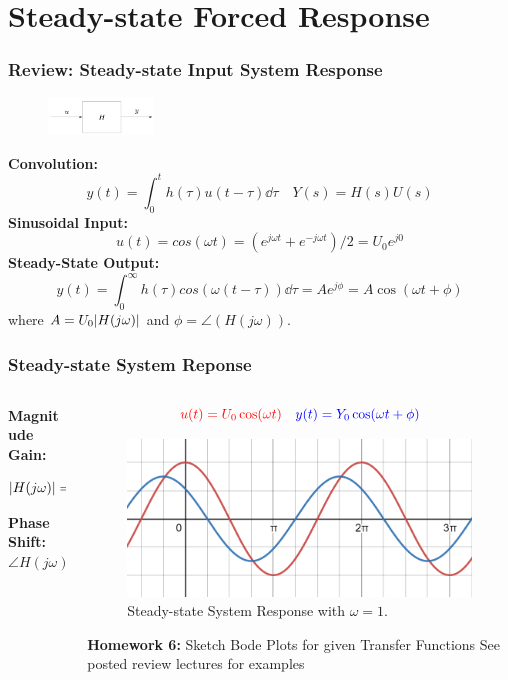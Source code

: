 \documentclass[aspectratio=169]{beamer}
\begin{document}
\section{Steady-state Forced Response}
\begin{frame}
	\frametitle{Review: Steady-state Input System Response}
	\begin{figure}
		\centering
		\includegraphics[width = 0.25\textwidth]{Images/H(s)_BlockDiagram.png}
	\end{figure}
	\textbf{Convolution:} 
	\[
		y(t) = \int_{0}^{t} h(\tau) u(t - \tau) \dd \tau 
		\quad 
		Y(s) = H(s) U(s)
	\]
	\textbf{Sinusoidal Input:} 
	\[
		u(t) = cos(\omega t) = (e^{j\omega t} + e^{-j\omega t})/2 = U_0 e^{j 0}
	\]
	\textbf{Steady-State Output:} 
	\[
		y(t) = \int_{0}^{\infty} h(\tau) cos(\omega (t - \tau)) \dd \tau = A e^{j \phi} = A \cos(\omega t + \phi)
	\]
	where $A = U_0 \abs{H(j \omega)}$ and $\phi = \angle(H(j \omega))$.
\end{frame}


\begin{frame}
	\frametitle{Steady-state System Reponse}
	\begin{columns}
		\begin{column}{0.3\textwidth}
			\textbf{Magnitude Gain:} 
			\[\abs{H(j\omega)} = \frac{Y_0}{U_0} = \frac{1.5}{2} = 0.75\]
			\textbf{Phase Shift:}
			\[\angle{H(j\omega)} = \phi = \frac{\pi}{4}\]
		\end{column}
		\begin{column}{0.5\textwidth}
			\[
				\color{red}
				u(t) = U_0 \cos(\omega t)
				\quad
				\color{blue}
				y(t) = Y_0 \cos(\omega t + \phi)
			\]
			\begin{figure}
				\includegraphics[width=\textwidth]{Images/phase_shift.png}
				Steady-state System Response with $\omega = 1$.
			\end{figure}
			\footnotesize{
				\textbf{Homework 6:}
				Sketch Bode Plots for given Transfer Functions
				\tiny{See posted review lectures for examples}
			}
		\end{column}
	\end{columns}
\end{frame}
\end{document}
